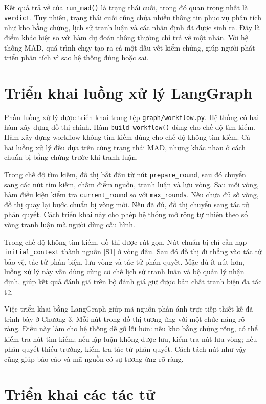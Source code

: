﻿\documentclass[oneside,a4paper,12pt]{extreport}
\begin{document}
Kết quả trả về của \texttt{run\_mad()} là trạng thái cuối, trong đó quan trọng nhất là \texttt{verdict}. Tuy nhiên, trạng thái cuối cũng chứa nhiều thông tin phục vụ phân tích như kho bằng chứng, lịch sử tranh luận và các nhận định đã được sinh ra. Đây là điểm khác biệt so với hàm dự đoán thông thường chỉ trả về một nhãn. Với hệ thống MAD, quá trình chạy tạo ra cả một dấu vết kiểm chứng, giúp người phát triển phân tích vì sao hệ thống đúng hoặc sai.

\section{Triển khai luồng xử lý LangGraph}

Phần luồng xử lý được triển khai trong tệp \texttt{graph/workflow.py}. Hệ thống có hai hàm xây dựng đồ thị chính. Hàm \texttt{build\_workflow()} dùng cho chế độ tìm kiếm. Hàm xây dựng workflow không tìm kiếm dùng cho chế độ không tìm kiếm. Cả hai luồng xử lý đều dựa trên cùng trạng thái MAD, nhưng khác nhau ở cách chuẩn bị bằng chứng trước khi tranh luận.

Trong chế độ tìm kiếm, đồ thị bắt đầu từ nút \texttt{prepare\_round}, sau đó chuyển sang các nút tìm kiếm, chấm điểm nguồn, tranh luận và lưu vòng. Sau mỗi vòng, hàm điều kiện kiểm tra \texttt{current\_round} so với \texttt{max\_rounds}. Nếu chưa đủ số vòng, đồ thị quay lại bước chuẩn bị vòng mới. Nếu đã đủ, đồ thị chuyển sang tác tử phán quyết. Cách triển khai này cho phép hệ thống mở rộng tự nhiên theo số vòng tranh luận mà người dùng cấu hình.

Trong chế độ không tìm kiếm, đồ thị được rút gọn. Nút chuẩn bị chỉ cần nạp \texttt{initial\_context} thành nguồn [S1] ở vòng đầu. Sau đó đồ thị đi thẳng vào tác tử bảo vệ, tác tử phản biện, lưu vòng và tác tử phán quyết. Mặc dù ít nút hơn, luồng xử lý này vẫn dùng cùng cơ chế lịch sử tranh luận và bộ quản lý nhận định, giúp kết quả đánh giá trên bộ đánh giá giữ được bản chất tranh biện đa tác tử.

Việc triển khai bằng LangGraph giúp mã nguồn phản ánh trực tiếp thiết kế đã trình bày ở Chương 3. Mỗi nút trong đồ thị tương ứng với một chức năng rõ ràng. Điều này làm cho hệ thống dễ gỡ lỗi hơn: nếu kho bằng chứng rỗng, có thể kiểm tra nút tìm kiếm; nếu lập luận không được lưu, kiểm tra nút lưu vòng; nếu phán quyết thiếu trường, kiểm tra tác tử phán quyết. Cách tách nút như vậy cũng giúp báo cáo và mã nguồn có sự tương ứng rõ ràng.

\section{Triển khai các tác tử}
\end{document}
